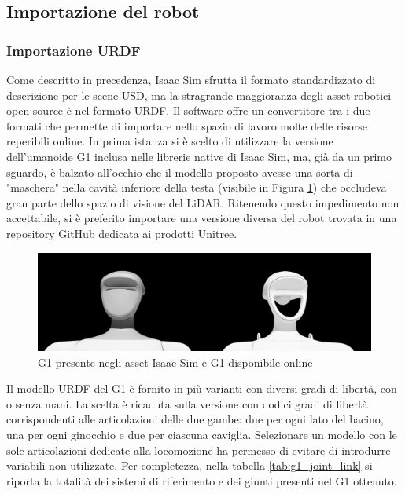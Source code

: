 \subsection{Importazione del robot}
\subsubsection{Importazione URDF}
Come descritto in precedenza, Isaac Sim sfrutta il formato standardizzato di descrizione per le scene USD, ma la stragrande maggioranza degli asset robotici open source è nel formato URDF. Il software offre un convertitore tra i due formati che permette di importare nello spazio di lavoro molte delle risorse reperibili online. In prima istanza si è scelto di utilizzare la versione dell'umanoide G1 inclusa nelle librerie native di Isaac Sim, ma, già da un primo sguardo, è balzato all'occhio che il modello proposto avesse una sorta di "maschera" nella cavità inferiore della testa (visibile in Figura \ref{fig:confronto_g1}) che occludeva gran parte dello spazio di visione del LiDAR. Ritenendo questo impedimento non accettabile, si è preferito importare una versione diversa del robot trovata in una repository GitHub dedicata ai prodotti Unitree. 

\begin{figure}[h]
    \centering
    \includegraphics[width=0.75\linewidth]{immagini/g1_versions.png}
    \caption{G1 presente negli asset Isaac Sim e G1 disponibile online}
    \label{fig:confronto_g1}
\end{figure}

Il modello URDF del G1 è fornito in più varianti con diversi gradi di libertà, con o senza mani. La scelta è ricaduta sulla versione con dodici gradi di libertà corrispondenti alle articolazioni delle due gambe: due per ogni lato del bacino, una per ogni ginocchio e due per ciascuna caviglia. Selezionare un modello con le sole articolazioni dedicate alla locomozione ha permesso di evitare di introdurre variabili non utilizzate. Per completezza, nella tabella \ref{tab:g1_joint_link} si riporta la totalità dei sistemi di riferimento e dei giunti presenti nel G1 ottenuto.

